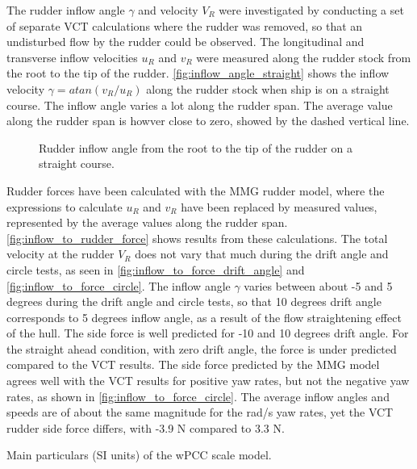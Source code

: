 The rudder inflow angle $\gamma$ and velocity $V_R$ were investigated by conducting a set of separate VCT calculations where the rudder was removed, so that an undisturbed flow by the rudder could be observed. The longitudinal and transverse inflow velocities $u_R$ and $v_R$ were measured along the rudder stock from the root to the tip of the rudder. \autoref{fig:inflow_angle_straight} shows the inflow velocity $\gamma=atan(v_R/u_R)$ along the rudder stock when ship is on a straight course. The inflow angle varies a lot along the rudder span. The average value along the rudder span is howver close to zero, showed by the dashed vertical line.
\begin{figure}[h]
    \centering 
    
    \caption{Rudder inflow angle from the root to the tip of the rudder on a straight course.}
     \label{fig:inflow_angle_straight}
\end{figure}
Rudder forces have been calculated with the MMG rudder model, where the expressions to calculate $u_R$ and $v_R$ have been replaced by measured values, represented by the average values along the rudder span. \autoref{fig:inflow_to_rudder_force} shows results from these calculations. The total velocity at the rudder $V_R$ does not vary that much during the drift angle and circle tests, as seen in \autoref{fig:inflow_to_force_drift_angle} and \autoref{fig:inflow_to_force_circle}. The inflow angle $\gamma$ varies between about -5 and 5 degrees during the drift angle and circle tests, so that 10 degrees drift angle corresponds to 5 degrees inflow angle, as a result of the flow straightening effect of the hull. The side force is well predicted for -10 and 10 degrees drift angle. For the straight ahead condition, with zero drift angle, the force is under predicted compared to the VCT results. The side force predicted by the MMG model agrees well with the VCT results for positive yaw rates, but not the negative yaw rates, as shown in \autoref{fig:inflow_to_force_circle}. The average inflow angles and speeds are of about the same magnitude for the  rad/s yaw rates, yet the VCT rudder side force differs, with -3.9 N compared to 3.3 N. 
\begin{table}[h]
    \centering
    \caption{Main particulars (SI units) of the wPCC scale model.}
    \label{tab:main_particulars}
\end{table}
